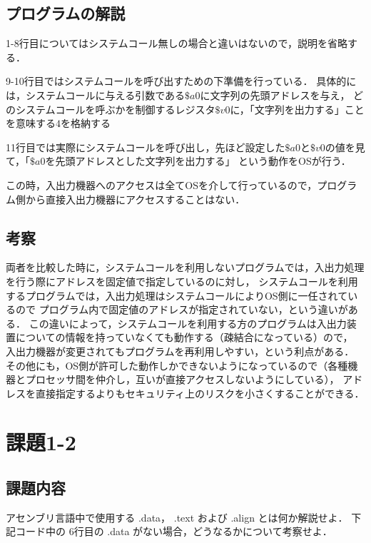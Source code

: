 \documentclass[a4j,11pt]{jarticle}
\begin{document}
\subsection{プログラムの解説}
1-8行目についてはシステムコール無しの場合と違いはないので，説明を省略する．

9-10行目ではシステムコールを呼び出すための下準備を行っている．
具体的には，システムコールに与える引数である$\$a0$に文字列の先頭アドレスを与え，
どのシステムコールを呼ぶかを制御するレジスタ$\$v0$に，「文字列を出力する」ことを意味する$4$を格納する

11行目では実際にシステムコールを呼び出し，先ほど設定した$\$a0$と$\$v0$の値を見て，「$\$a0$を先頭アドレスとした文字列を出力する」
という動作をOSが行う．

この時，入出力機器へのアクセスは全てOSを介して行っているので，プログラム側から直接入出力機器にアクセスすることはない．

\subsection{考察}

両者を比較した時に，システムコールを利用しないプログラムでは，入出力処理を行う際にアドレスを固定値で指定しているのに対し，
システムコールを利用するプログラムでは，入出力処理はシステムコールによりOS側に一任されているので
プログラム内で固定値のアドレスが指定されていない，という違いがある．
この違いによって，システムコールを利用する方のプログラムは入出力装置についての情報を持っていなくても動作する（疎結合になっている）ので，
入出力機器が変更されてもプログラムを再利用しやすい，という利点がある．
その他にも，OS側が許可した動作しかできないようになっているので（各種機器とプロセッサ間を仲介し，互いが直接アクセスしないようにしている），
アドレスを直接指定するよりもセキュリティ上のリスクを小さくすることができる．

\section{課題1-2}

\subsection{課題内容}
アセンブリ言語中で使用する .data， .text および .align とは何か解説せよ．
 下記コード中の 6行目の .data がない場合，どうなるかについて考察せよ．
\end{document}
